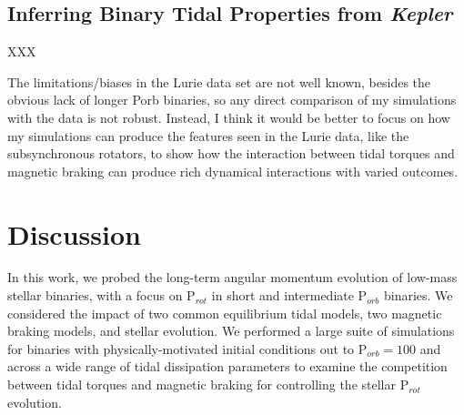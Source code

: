 \documentclass[twocolumn]{aastex61}
\newcommand{\kepler}[0]{\textit{Kepler}\xspace}
\begin{document}

\subsection{Inferring Binary Tidal Properties from \kepler} \label{sec:inference}

XXX

The limitations/biases in the Lurie data set are not well known, besides the obvious lack of longer Porb binaries, so any direct comparison of my simulations with the data is not robust.  Instead, I think it would be better to focus on how my simulations can produce the features seen in the Lurie data, like the subsynchronous rotators, to show how the interaction between tidal torques and magnetic braking can produce rich dynamical interactions with varied outcomes. 

\section{Discussion} \label{sec:discussion}

In this work, we probed the long-term angular momentum evolution of low-mass stellar binaries, with a focus on P$_{rot}$ in short and intermediate P$_{orb}$ binaries.  We considered the impact of two common equilibrium tidal models, two magnetic braking models, and stellar evolution.  We performed a large suite of simulations for binaries with physically-motivated initial conditions out to P$_{orb} = 100$ and across a wide range of tidal dissipation parameters to examine the competition between tidal torques and magnetic braking for controlling the stellar P$_{rot}$ evolution. 
\end{document}
